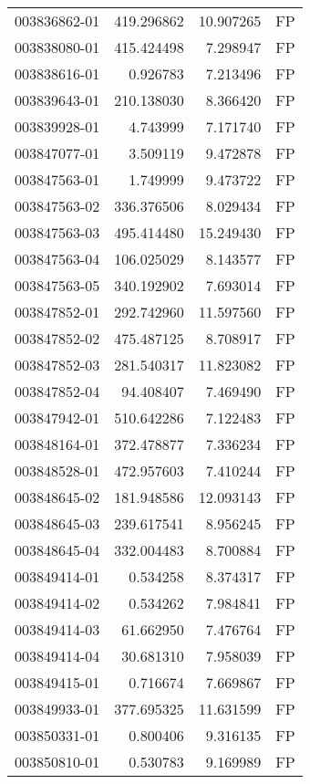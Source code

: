 \begin{tabular}{lrrl}
003836862-01 &  419.296862 &    10.907265 &   FP \\
003838080-01 &  415.424498 &     7.298947 &   FP \\
003838616-01 &    0.926783 &     7.213496 &   FP \\
003839643-01 &  210.138030 &     8.366420 &   FP \\
003839928-01 &    4.743999 &     7.171740 &   FP \\
003847077-01 &    3.509119 &     9.472878 &   FP \\
003847563-01 &    1.749999 &     9.473722 &   FP \\
003847563-02 &  336.376506 &     8.029434 &   FP \\
003847563-03 &  495.414480 &    15.249430 &   FP \\
003847563-04 &  106.025029 &     8.143577 &   FP \\
003847563-05 &  340.192902 &     7.693014 &   FP \\
003847852-01 &  292.742960 &    11.597560 &   FP \\
003847852-02 &  475.487125 &     8.708917 &   FP \\
003847852-03 &  281.540317 &    11.823082 &   FP \\
003847852-04 &   94.408407 &     7.469490 &   FP \\
003847942-01 &  510.642286 &     7.122483 &   FP \\
003848164-01 &  372.478877 &     7.336234 &   FP \\
003848528-01 &  472.957603 &     7.410244 &   FP \\
003848645-02 &  181.948586 &    12.093143 &   FP \\
003848645-03 &  239.617541 &     8.956245 &   FP \\
003848645-04 &  332.004483 &     8.700884 &   FP \\
003849414-01 &    0.534258 &     8.374317 &   FP \\
003849414-02 &    0.534262 &     7.984841 &   FP \\
003849414-03 &   61.662950 &     7.476764 &   FP \\
003849414-04 &   30.681310 &     7.958039 &   FP \\
003849415-01 &    0.716674 &     7.669867 &   FP \\
003849933-01 &  377.695325 &    11.631599 &   FP \\
003850331-01 &    0.800406 &     9.316135 &   FP \\
003850810-01 &    0.530783 &     9.169989 &   FP \\

\end{tabular}
